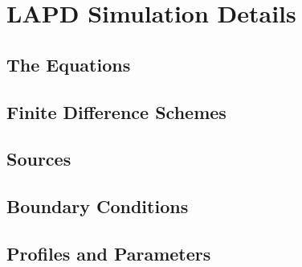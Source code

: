 \chapter{LAPD Simulation Details}

\section{The Equations}

\section{Finite Difference Schemes}

\section{Sources}

\section{Boundary Conditions}

\section{Profiles and Parameters}
